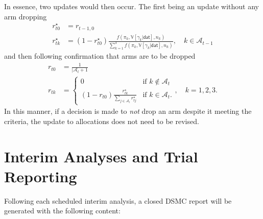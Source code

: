 \documentclass[11pt,parskip=half-]{scrartcl}
\begin{document}
In essence, two updates would then occur. The first being an update without any arm dropping
$$
  \begin{aligned}
    r_{t0}^\star & = r_{t-1,0}                                                                                                                                                           \\
    r_{tk}^\star & = (1 - r_{t0}^\star)\frac{f(\pi_k, \mathbb V[\gamma_k|\mathsf{dat}], n_k)}{\sum_{k=1}^3 f(\pi_k, \mathbb V[\gamma_k|\mathsf{dat}], n_k)}, \quad k\in\mathcal{A}_{t-1}
  \end{aligned}
$$
and then following confirmation that arms are to be dropped
$$
  \begin{aligned}
    r_{t0} & = \frac{1}{|\mathcal{A}_t + 1}               \\
    r_{tk} & = \begin{cases}
      0                                                                       & \text{if } k \notin \mathcal{A}_t \\
      (1 - r_{t0}) \frac{r_{tk}^\star}{\sum_{j\in\mathcal{A}_t} r_{tj}^\star} & \text{if } k \in \mathcal{A}_t.
    \end{cases}, \quad k=1,2,3.
  \end{aligned}
$$
In this manner, if a decision is made to \emph{not} drop an arm despite it meeting the criteria, the update to allocations does not need to be revised.

\clearpage

\section{Interim Analyses and Trial Reporting}\label{interim-analyses-and-trial-reporting}

Following each scheduled interim analysis, a closed DSMC report will be generated with the following content:
\end{document}
